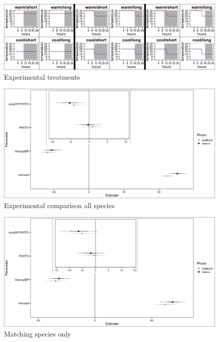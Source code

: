 \documentclass[12pt]{article}\usepackage[]{graphicx}\usepackage[]{color}
\begin{document}
  

\begin{figure}[h!]
    \centering
 \includegraphics[width=\textwidth]{..//Plots/Just_treats.jpeg}
    \caption{Experimental treatments}
    \label{fig:Figure 1}
\end{figure}

\begin{figure}[h!]
    \centering
 \includegraphics[width=\textwidth]{..//Plots/photothermo_allsps.jpeg}
    \caption{Experimental comparison all species}
    \label{fig:Figure 2}
\end{figure}

\begin{figure}[h!]
    \centering
 \includegraphics[width=\textwidth]{..//Plots/photothermo_matchsps.jpeg}
    \caption{Matching species only}
    \label{fig:Figure 3}
\end{figure}
\end{document}
